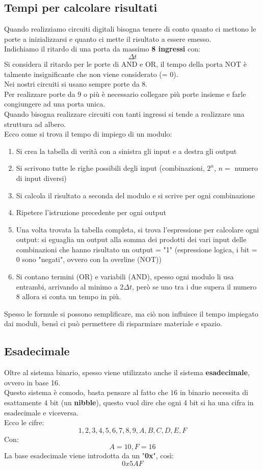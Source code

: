 \documentclass[12pt,a4paper]{article}
\begin{document}
\subsection{Tempi per calcolare risultati}
Quando realizziamo circuiti digitali bisogna tenere di conto quanto ci mettono le porte a inizializzarsi e quanto ci mette il risultato a essere emesso.\\
Indichiamo il ritardo di una porta da massimo \textbf{8 ingressi} con:
\[
\Delta t
\]
Si considera il ritardo per le porte di AND e OR, il tempo della porta NOT è talmente insignificante che non viene considerato (= 0).\\
Nei nostri circuiti si usano sempre porte da 8.\\
Per realizzare porte da 9 o più è necessario collegare più porte insieme e farle congiungere ad una porta unica.\\
Quando bisogna realizzare circuiti con tanti ingressi si tende a realizzare una struttura ad albero.\\
Ecco come si trova il tempo di impiego di un modulo:
\begin{enumerate}
    \item Si crea la tabella di verità con a sinistra gli input e a destra gli output
    \item Si scrivono tutte le righe possibili degli input (combinazioni, $2^n$, $n =$ numero di input diversi)
    \item Si calcola il risultato a seconda del modulo e si scrive per ogni combinazione
    \item Ripetere l'istruzione precedente per ogni output
    \item Una volta trovata la tabella completa, si trova l'espressione per calcolare ogni output: si eguaglia un output alla somma dei prodotti dei vari input delle combinazioni che hanno risultato un output = "1" (espressione logica, i bit = 0 sono "negati", ovvero con la overline (NOT))
    \item Si contano termini (OR) e variabili (AND), spesso ogni modulo li usa entrambi, arrivando al minimo a $2\Delta t$, però se uno tra i due supera il numero 8 allora si conta un tempo in più.
\end{enumerate}
Spesso le formule si possono semplificare, ma ciò non influisce il tempo impiegato dai moduli, bensì ci può permettere di risparmiare materiale e spazio.
\subsection{Esadecimale}
Oltre al sistema binario, spesso viene utilizzato anche il sistema \textbf{esadecimale}, ovvero in base 16.\\
Questo sistema è comodo, basta pensare al fatto che $16$ in binario necessita di esattamente $4$ bit (un \textbf{nibble}), questo vuol dire che ogni 4 bit si ha una cifra in esadecimale e viceversa.\\
Ecco le cifre:
\[
1, 2, 3, 4, 5, 6, 7, 8, 9, A, B, C, D, E, F
\]
Con:
\[
A = 10,F = 16
\]
La base esadecimale viene introdotta da un "\textbf{0x}", così:
\[
0x5AF
\]
\end{document}
